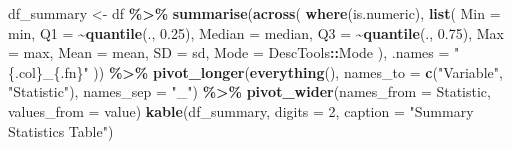 \documentclass[
]{article}
\newenvironment{Shaded}{\begin{snugshade}}{\end{snugshade}}
\newcommand{\AttributeTok}[1]{\textcolor[rgb]{0.13,0.29,0.53}{#1}}
\newcommand{\DecValTok}[1]{\textcolor[rgb]{0.00,0.00,0.81}{#1}}
\newcommand{\FloatTok}[1]{\textcolor[rgb]{0.00,0.00,0.81}{#1}}
\newcommand{\FunctionTok}[1]{\textcolor[rgb]{0.13,0.29,0.53}{\textbf{#1}}}
\newcommand{\NormalTok}[1]{#1}
\newcommand{\OtherTok}[1]{\textcolor[rgb]{0.56,0.35,0.01}{#1}}
\newcommand{\SpecialCharTok}[1]{\textcolor[rgb]{0.81,0.36,0.00}{\textbf{#1}}}
\newcommand{\StringTok}[1]{\textcolor[rgb]{0.31,0.60,0.02}{#1}}
\begin{document}
\begin{Shaded}
\begin{Highlighting}[]
\NormalTok{df\_summary }\OtherTok{\textless{}{-}}\NormalTok{   df }\SpecialCharTok{\%\textgreater{}\%}
    \FunctionTok{summarise}\NormalTok{(}\FunctionTok{across}\NormalTok{(}
      \FunctionTok{where}\NormalTok{(is.numeric),  }
      \FunctionTok{list}\NormalTok{(}
        \AttributeTok{Min =}\NormalTok{ min, }
        \AttributeTok{Q1 =} \SpecialCharTok{\textasciitilde{}}\FunctionTok{quantile}\NormalTok{(., }\FloatTok{0.25}\NormalTok{), }
        \AttributeTok{Median =}\NormalTok{ median, }
        \AttributeTok{Q3 =} \SpecialCharTok{\textasciitilde{}}\FunctionTok{quantile}\NormalTok{(., }\FloatTok{0.75}\NormalTok{), }
        \AttributeTok{Max =}\NormalTok{ max, }
        \AttributeTok{Mean =}\NormalTok{ mean, }
        \AttributeTok{SD =}\NormalTok{ sd,}
        \AttributeTok{Mode =}\NormalTok{ DescTools}\SpecialCharTok{::}\NormalTok{Mode}
\NormalTok{      ),}
      \AttributeTok{.names =} \StringTok{"\{.col\}\_\{.fn\}"}  
\NormalTok{    )) }\SpecialCharTok{\%\textgreater{}\%}
    \FunctionTok{pivot\_longer}\NormalTok{(}\FunctionTok{everything}\NormalTok{(), }
                 \AttributeTok{names\_to =} \FunctionTok{c}\NormalTok{(}\StringTok{"Variable"}\NormalTok{, }\StringTok{"Statistic"}\NormalTok{), }
                 \AttributeTok{names\_sep =} \StringTok{"\_"}\NormalTok{) }\SpecialCharTok{\%\textgreater{}\%}
    \FunctionTok{pivot\_wider}\NormalTok{(}\AttributeTok{names\_from =}\NormalTok{ Statistic, }\AttributeTok{values\_from =}\NormalTok{ value)}
\FunctionTok{kable}\NormalTok{(df\_summary, }\AttributeTok{digits =} \DecValTok{2}\NormalTok{, }\AttributeTok{caption =} \StringTok{"Summary Statistics Table"}\NormalTok{)}
\end{Highlighting}
\end{Shaded}
\end{document}
